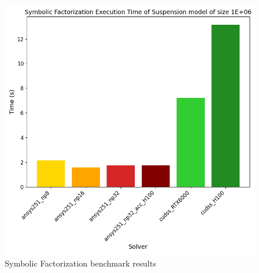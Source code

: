 \begin{figure}[H]
    \includegraphics[width=0.49\linewidth]{results/cudss_bench/suspension_symbolic_facto_1E6.png}
    \caption{Symbolic Factorization benchmark results}
    \label{fig:cudss_symbo}
\end{figure}

